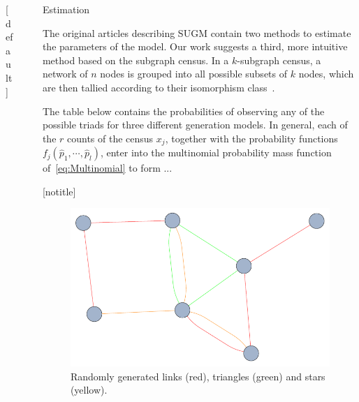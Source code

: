 \documentclass[final]{beamer}
\newlength{\sepwid}
\newlength{\onecolwid}
\newlength{\threecolwid}
\begin{document}
\begin{frame}[t]
\begin{columns}[t]
\begin{column}{\threecolwid}
\begin{columns}[t,totalwidth=\threecolwid]
\begin{column}{\onecolwid}
\begin{block}
\end{block}
[default]

\end{column} %

\begin{column}{\sepwid}\end{column} %

\begin{column}{\onecolwid}\vspace{-.6in} %

\begin{block}{Estimation}

The original articles describing SUGM contain two methods to estimate the parameters of the model. Our work suggests a third, more intuitive method based on the subgraph census. In a $k$-subgraph census, a network of $n$ nodes is grouped into all possible subsets of $k$ nodes, which are then tallied according to their isomorphism class~\cite{Davis1972,Holland1970,Holland1976}.

The table below contains the probabilities of observing any of the possible triads for three different generation models. In general, each of the $r$ counts of the census $x_{j}$, together with the probability functions $f_{j}(\hat{p}_{1},\cdots,\hat{p}_{l})$, enter into the multinomial probability mass function of~\eqref{eq:Multinomial} to form ...

\end{block}

[notitle]
\begin{block}

\begin{figure}
\includegraphics[width=0.8\linewidth]{../Figure02_2.pdf}
\caption{\hspace{3mm}Randomly generated links (red), triangles (green) and stars (yellow).}
\label{fig:Figure02}
\end{figure}


\end{block}
\end{column}
\end{columns}
\end{column}
\end{columns}
\end{frame}
\end{document}
